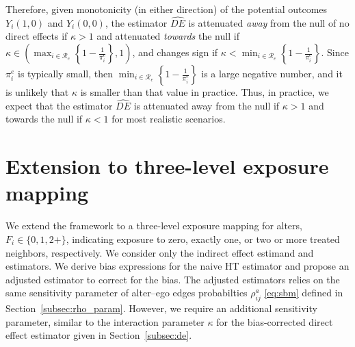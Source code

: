\documentclass[11pt]{article}
\theoremstyle{definition}
\def \cR {\mathcal{R}}
\begin{document}
Therefore, given monotonicity (in either direction) of the potential outcomes $Y_i(1,0)$ and $Y_i(0,0)$, 
the estimator $\widehat{DE}$ is attenuated \emph{away} from the null of no direct effects
if $\kappa > 1$ and attenuated \emph{towards} the null if $\kappa \in \left( \max_{i \in \cR_e}\left\{1 - \frac{1}{\pi_i^e}\right\},
             1 \right)$, and changes sign if $\kappa < \min_{i \in \cR_e}\left\{1 - \frac{1}{\pi_i^e}\right\}$.
Since $\pi_i^e$ is typically small, then $\min_{i \in \cR_e}\left\{1 - \frac{1}{\pi_i^e}\right\}$ is a large negative number, and it is unlikely that $\kappa$ is smaller than that value in practice.
Thus, in practice, we expect that the estimator $\widehat{DE}$ is attenuated away from the null if $\kappa > 1$ and towards the null if $\kappa < 1$
for most realistic scenarios.

\section{Extension to three-level exposure mapping}
\label{apdx.sec:three_level_em}

We extend the framework to a three-level exposure mapping for alters, $F_i \in \{0, 1, 2+\}$,
 indicating exposure to zero, exactly one, or two or more treated neighbors, respectively. 
 We consider only the indirect effect estimand and estimators.
 We derive bias expressions for the naive HT estimator
 and propose an adjusted estimator to correct for the bias.
 The adjusted estimators relies 
 on the same sensitivity parameter of alter--ego edges probabilties $\rho^a_{ij}$ \eqref{eq:sbm}
  defined in Section~\ref{subsec:rho_param}.
 However, we require an additional sensitivity parameter, similar to the interaction 
 parameter $\kappa$ for the bias-corrected direct effect estimator given in Section~\ref{subsec:de}.
\end{document}
